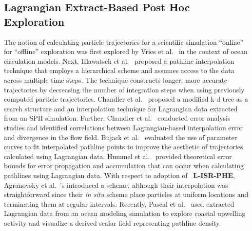 

\subsection{Lagrangian Extract-Based Post Hoc Exploration}
The notion of calculating particle trajectories for a scientific simulation ``online'' for ``offline'' exploration was first explored by Vries et al.~\cite{vries2001calculating} in the context of ocean circulation models.
%
Next, Hlawatsch et al.~\cite{hlawatsch2011hierarchical} proposed a pathline interpolation technique that employs a hierarchical scheme and assumes access to the data across multiple time steps.
%
The technique constructs longer, more accurate trajectories by decreasing the number of integration steps when using previously computed particle trajectories.
%
Chandler et al.~\cite{chandler2015interpolation} proposed a modified k-d tree as a search structure and an interpolation technique for Lagrangian data extracted from an SPH simulation.
%
Further, Chandler et al.~\cite{chandler2016analysis} conducted error analysis studies and identified correlations between Lagrangian-based interpolation error and divergence in the flow field.
%
Bujack et al.~\cite{bujack2015lagrangian} evaluated the use of parameter curves to fit interpolated pathline points to improve the aesthetic of trajectories calculated using Lagrangian data.
%
Hummel et al.~\cite{hummel2016error} provided theoretical error bounds for error propagation and accumulation that can occur when calculating pathlines using Lagrangian data. 
%
With respect to adoption of ~\textbf{L-ISR-PHE}, 
Agranovsky et al.~\cite{agranovsky2014improved}'s introduced a scheme, although their interpolation
was straightforward since their \textit{in situ} scheme place particles at uniform locations
and terminating them at regular intervals.
Recently, Pascal et al.~\cite{envirvis.20171099,siegfried2019tropical} used extracted Lagrangian data from an ocean modeling simulation to explore coastal upwelling activity and visualize a derived scalar field representing pathline density.




